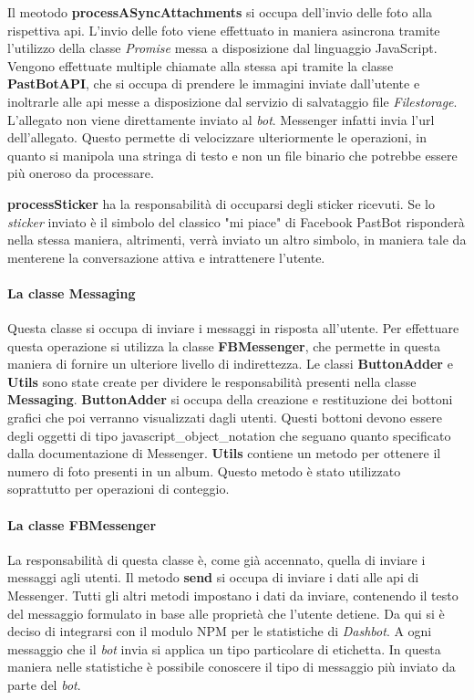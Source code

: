 Il meotodo \textbf{processASyncAttachments} si occupa dell'invio delle foto
alla rispettiva \gls{api}. L'invio delle foto viene effettuato in maniera
asincrona tramite l'utilizzo della classe \textit{Promise} messa a disposizione
dal linguaggio JavaScript. Vengono effettuate multiple chiamate alla stessa
\gls{api} tramite la classe \textbf{PastBotAPI}, che si occupa di prendere le
immagini inviate dall'utente e inoltrarle alle \gls{api} messe a disposizione
dal servizio di salvataggio file \textit{Filestorage}.
L'allegato non viene direttamente inviato al \textit{bot}. Messenger infatti
invia l'\gls{url} dell'allegato. Questo permette di velocizzare ulteriormente le
operazioni, in quanto si manipola una stringa di testo e non un file binario
che potrebbe essere più oneroso da processare.

\textbf{processSticker} ha la responsabilità di occuparsi degli sticker
ricevuti. Se lo \textit{sticker} inviato è il simbolo del classico "mi piace"
di Facebook PastBot risponderà nella stessa maniera, altrimenti, verrà inviato
un altro simbolo, in maniera tale da menterene la conversazione attiva e
intrattenere l'utente.

\paragraph*{La classe Messaging} Questa classe si occupa di inviare i messaggi
in risposta all'utente. Per effettuare questa operazione si utilizza la classe
\textbf{FBMessenger}, che permette in questa maniera di fornire un ulteriore
livello di indirettezza. Le classi \textbf{ButtonAdder} e \textbf{Utils} sono
state create per dividere le responsabilità presenti nella classe
\textbf{Messaging}. \textbf{ButtonAdder} si occupa della creazione e
restituzione dei bottoni grafici che poi verranno visualizzati dagli utenti.
Questi bottoni devono essere degli oggetti di tipo
\gls{javascript_object_notation} che seguano quanto specificato dalla
documentazione di Messenger.
\textbf{Utils} contiene un metodo per ottenere il numero di foto presenti in un
album. Questo metodo è stato utilizzato soprattutto per operazioni di conteggio.

\paragraph*{La classe FBMessenger} La responsabilità di questa classe è, come
già accennato, quella di inviare i messaggi agli utenti. Il metodo
\textbf{send} si occupa di inviare i dati alle \gls{api} di Messenger. Tutti gli
altri metodi impostano i dati da inviare, contenendo il testo del messaggio
formulato in base alle proprietà che l'utente detiene. Da qui si è deciso di
integrarsi con il modulo NPM per le statistiche di \textit{Dashbot}. A ogni
messaggio che il \textit{bot} invia si applica un tipo particolare di
etichetta. In questa maniera nelle statistiche è possibile conoscere il tipo di
messaggio più inviato da parte del \textit{bot}.
